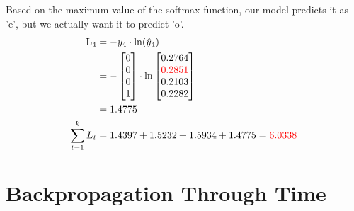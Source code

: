 \documentclass{article}
\begin{document}
Based on the maximum value of the softmax function, our model predicts it as 'e', but we actually want it to predict 'o'.
\begin{align*}
    \text{L}_{4} & = -y_4 \cdot \ln(\hat{y}_4) \\
    &=-\begin{bmatrix} 0 \\ 0 \\ 0 \\ 1 \end{bmatrix} \cdot \ln{\begin{bmatrix} 0.2764 \\ \textcolor{red}{0.2851} \\ 0.2103 \\ 0.2282 \end{bmatrix}}\\
    &=1.4775\\
    \sum_{t=1}^k L_t & = 1.4397 + 1.5232 + 1.5934 + 1.4775 = \textcolor{red}{6.0338}
\end{align*}

\section{Backpropagation Through Time}
\end{document}
